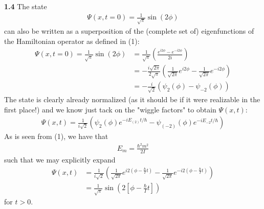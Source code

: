 \documentclass[a4paper]{article}
\begin{document}
    \textbf{1.4} The state \begin{align*}
        \Psi (x, t = 0) = \frac{1}{\sqrt{\pi } } \sin (2 \phi )
    \end{align*} 
    can also be written as a superposition of the (complete set of) eigenfunctions of the Hamiltonian operator as defined in (1):
    \begin{align*}
        \Psi (x, t = 0) = \frac{1}{\sqrt{\pi } } \sin (2 \phi ) &= \frac{1}{\sqrt{\pi }}\left( \frac{e^{i2 \phi } - e^{-i2 \phi }}{2i} \right) \\
        &= -\frac{i \sqrt{2 \pi } }{2\sqrt{\pi } } \left(\frac{1}{\sqrt{2 \pi } } e^{i 2\phi } - \frac{1}{\sqrt{2 \pi } } e^{- i 2 \phi }  \right) \\
        &= -\frac{i}{\sqrt{2} } \left( \psi_2 (\phi ) - \psi _{-2}(\phi ) \right) 
    \end{align*}
    The state is clearly already normalized (as it should be if it were realizable in the first place!) and we know just tack on the "wiggle factors" to obtain \(\Psi (x, t)\):
    \begin{align*}
        \Psi (x, t) = \frac{1}{i \sqrt{2} } \left( \psi _2 (\phi ) e^{-i E_{(2)} t / \hbar } - \psi _{(-2)}(\phi )e^{-i E_{-2} t / \hbar } \right)
    \end{align*} 
    As is seen from (1), we have that \begin{align*}
        E_m = \frac{\hbar ^{2} m^{2} }{2 I}
    \end{align*}
    such that we may explicitly expand
    \begin{align*}
        \Psi(x, t) &= \frac{1}{i \sqrt{2} } \left( \frac{1}{\sqrt{2\pi }}e^{i 2\left(\phi - \frac{\hbar}{I}t \right) } - \frac{1}{\sqrt{2\pi } } e^{-i 2 \left( \phi - \frac{\hbar }{I} t \right)} \right) \\
        &= \frac{1}{\sqrt{\pi }} \sin \left( 2 \left[ \phi  - \frac{\hbar}{I} t \right]  \right) 
    \end{align*}
    for \(t > 0\). 
\end{document}
